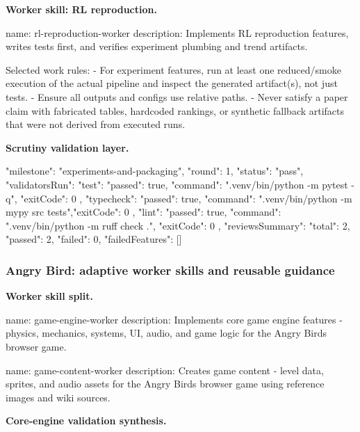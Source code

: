 \documentclass[11pt,a4paper]{article}
\begin{document}
\textbf{Worker skill: RL reproduction.}

\begin{cbox}
name: rl-reproduction-worker
description: Implements RL reproduction features, writes tests first, and verifies
  experiment plumbing and trend artifacts.

Selected work rules:
- For experiment features, run at least one reduced/smoke execution of the
  actual pipeline and inspect the generated artifact(s), not just tests.
- Ensure all outputs and configs use relative paths.
- Never satisfy a paper claim with fabricated tables, hardcoded rankings, or
  synthetic fallback artifacts that were not derived from executed runs.
\end{cbox}

\textbf{Scrutiny validation layer.}

\begin{cbox}
{
  "milestone": "experiments-and-packaging",
  "round": 1,
  "status": "pass",
  "validatorsRun": {
    "test":      { "passed": true, "command": ".venv/bin/python -m pytest -q",   "exitCode": 0 },
    "typecheck": { "passed": true, "command": ".venv/bin/python -m mypy src tests","exitCode": 0 },
    "lint":      { "passed": true, "command": ".venv/bin/python -m ruff check .", "exitCode": 0 }
  },
  "reviewsSummary": { "total": 2, "passed": 2, "failed": 0, "failedFeatures": [] }
}
\end{cbox}

\subsubsection{Angry Bird: adaptive worker skills and reusable guidance}

\textbf{Worker skill split.}

\begin{cbox}
name: game-engine-worker
description: Implements core game engine features - physics, mechanics, systems,
  UI, audio, and game logic for the Angry Birds browser game.
\end{cbox}

\begin{cbox}
name: game-content-worker
description: Creates game content - level data, sprites, and audio assets for the
  Angry Birds browser game using reference images and wiki sources.
\end{cbox}

\textbf{Core-engine validation synthesis.}
\end{document}
